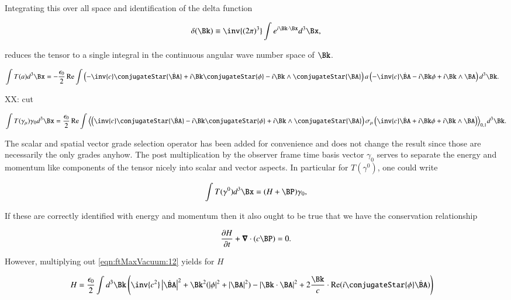 Integrating this over all space and identification of the delta function

\begin{align}
\label{eqn:ftMaxVacuum:9}
\delta(\Bk) \equiv \inv{(2 \pi)^3} \int e^{i \Bk \cdot \Bx} d^3 \Bx,
\end{align}

reduces the tensor to a single integral in the continuous angular wave number space of $\Bk$.

\begin{align}
\label{eqn:ftMaxVacuum:10}
\int T(a) d^3 \Bx &= -\frac{\epsilon_0}{2} \Real \int
\left(
- \inv{c} \conjugateStar{\dot{\BA}}
+ i \Bk \conjugateStar{\phi}
- i \Bk \wedge \conjugateStar{\BA}
\right)
a
\left(
- \inv{c} \dot{\BA}
- i \Bk \phi
+ i \Bk \wedge \BA
\right)
d^3 \Bk.
\end{align}

XX: cut

\begin{align}
\label{eqn:ftMaxVacuum:12}
\int T(\gamma_\mu) \gamma_0 d^3 \Bx =
\frac{\epsilon_0}{2} \Real \int
\gpgrade{
\left(
\inv{c} \conjugateStar{\dot{\BA}}
- i \Bk \conjugateStar{\phi}
+ i \Bk \wedge \conjugateStar{\BA}
\right)
\sigma_\mu
\left(
\inv{c} \dot{\BA}
+ i \Bk \phi
+ i \Bk \wedge \BA
\right)
}{0,1}
d^3 \Bk.
\end{align}

The scalar and spatial vector grade selection operator has been added for convenience and does not change the result since those are necessarily the only grades anyhow.  The post multiplication by the observer frame time basis vector $\gamma_0$ serves to separate the energy and momentum like components of the tensor nicely into scalar and vector aspects.  In particular for $T(\gamma^0)$, one could write

\begin{align}
\label{eqn:ftMaxVacuum:13}
\int T(\gamma^0) d^3 \Bx = (H + \BP) \gamma_0,
\end{align}

If these are correctly identified with energy and momentum then it also ought to be true that we have the conservation relationship

\begin{align}
\label{eqn:ftMaxVacuum:13b}
\PD{t}{H} + \spacegrad \cdot (c \BP) = 0.
\end{align}

However, multiplying out \autoref{eqn:ftMaxVacuum:12} yields for $H$

\begin{align}
\label{eqn:ftMaxVacuum:14}
H &=
\frac{\epsilon_0}{2} \int d^3 \Bk \left(
\inv{c^2} \Abs{\dot{\BA}}^2 + \Bk^2 (\Abs{\phi}^2 + \Abs{\BA}^2 )
- \Abs{\Bk \cdot \BA}^2
+ 2 \frac{\Bk}{c} \cdot \Real( i \conjugateStar{\phi} \dot{\BA} )
\right)
\end{align}

